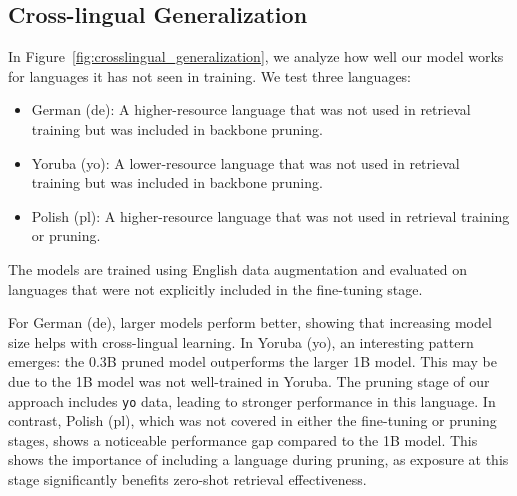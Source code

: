 \documentclass[]{fairmeta}
\begin{document}
\subsection{Cross-lingual Generalization}
\label{sec:cross-lingual}
In Figure~\ref{fig:crosslingual_generalization}, we analyze how well our model works for languages it has not seen in training. We test three languages:

\begin{itemize} \item German (de): A higher-resource language that was not used in retrieval training but was included in backbone pruning. \item Yoruba (yo): A lower-resource language that was not used in retrieval training but was included in backbone pruning. \item Polish (pl): A higher-resource language that was not used in retrieval training or pruning. \end{itemize}
The models are trained using English data augmentation and evaluated on languages that were not explicitly included in the fine-tuning stage.

For German (de), larger models perform better, showing that increasing model size helps with cross-lingual learning.
In Yoruba (yo), an interesting pattern emerges: the 0.3B pruned model outperforms the larger 1B model.
This may be due to the 1B model was not well-trained in Yoruba.
The pruning stage of our approach includes \texttt{yo} data, leading to stronger performance in this language. 
In contrast, Polish (pl), which was not covered in either the fine-tuning or pruning stages, shows a noticeable performance gap compared to the 1B model. 
This shows the importance of including a language during pruning, as exposure at this stage significantly benefits zero-shot retrieval effectiveness. 
\end{document}
